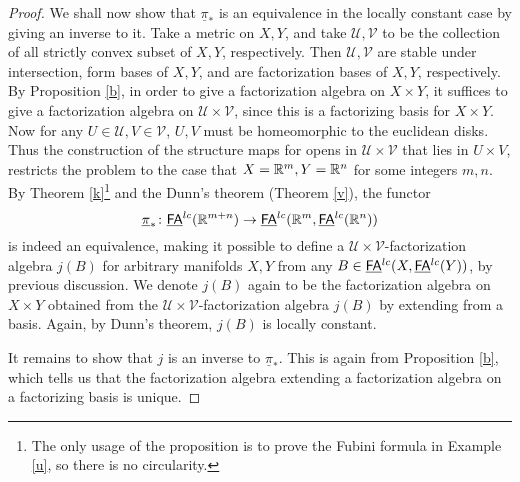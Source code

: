 \documentclass[twoside]{article}
\begin{document}
\begin{proof}
    We shall now show that $\underline\pi_*$ is an equivalence in the
    locally constant case by giving an inverse to it. Take a metric on $X,Y$,
    and take $\mathscr U,\mathscr V$ to be the collection of all
    strictly convex subset of $X,Y$, respectively. Then $\mathscr U,\mathscr V$
    are stable under intersection, form bases of $X,Y$, and are factorization bases
    of $X,Y$, respectively. By Proposition \ref{b}, in order to give a
    factorization algebra on $X\times Y$, it suffices to give a
    factorization algebra on $\mathscr U\times\mathscr V$,
    since this is a factorizing basis for $X\times Y$. Now for any
    $U\in\mathscr U,V\in\mathscr V$, $U,V$ must be homeomorphic to the euclidean
    disks. Thus the construction of the structure maps for opens in 
    $\mathscr U\times\mathscr V$ that lies in $U\times V$, restricts the problem
    to the case that $X=\mathbb{R}^m,Y=\mathbb{R}^n$ for some integers $m,n$. By 
    Theorem \ref{k}\footnote{The only usage of the proposition
    is to prove the Fubini formula in Example \ref{u}, so there is no circularity.}
    and the Dunn's theorem (Theorem \ref{v}), the functor
    \[\underline\pi_*\colon\underline{\smash{\mathsf{FA}}}^{lc}(\mathbb{R}^{m+n})\to\underline{\smash{\mathsf{FA}}}^{lc}(\mathbb{R}^m,\underline{\smash{\mathsf{FA}}}^{lc}(\mathbb{R}^n))\] is indeed
    an equivalence, making it possible to define a
    $\mathscr U\times\mathscr V$-factorization algebra $j(B)$ for arbitrary
    manifolds $X,Y$ from any $B\in\underline{\smash{\mathsf{FA}}}^{lc}(X,\underline{\smash{\mathsf{FA}}}^{lc}(Y))$, by previous discussion.
    We denote $j(B)$ again to be the factorization algebra on $X\times Y$ obtained
    from the $\mathscr U\times\mathscr V$-factorization algebra $j(B)$ by extending
    from a basis. Again, by Dunn's theorem, $j(B)$ is locally constant.

    It remains to show that $j$ is an inverse to $\underline\pi_*$. This is
    again from Proposition \ref{b}, which tells us that the factorization algebra
    extending a factorization algebra on a factorizing basis is unique.
\end{proof}
\end{document}
